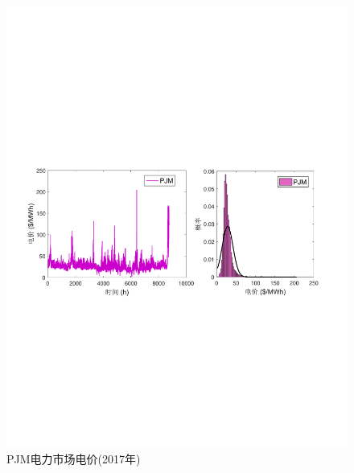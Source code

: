 \begin{figure}[H] %
  \centering
  \includegraphics[scale=0.75]{figures/Chap5-15-Price-PJM.pdf}
   \caption{PJM电力市场电价(2017年)}
  \label{fig:Price-PJM}
\end{figure}
